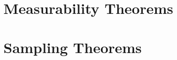 \documentclass[phd,letterpaper,lof,chaptercenter,parttop,electronic]{byumsphd}
\begin{document}



\appendix

\chapter{Measurability Theorems}
\label{ch:measurability}




\chapter{Sampling Theorems}
\label{ch:sampling-algorithm-proofs}








\end{document}
